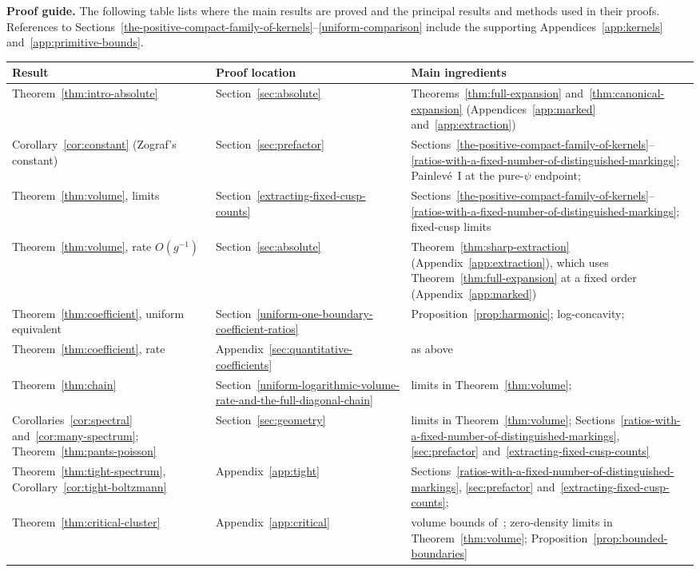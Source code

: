 \textbf{Proof guide.}
The following table lists where the main results are proved and the principal
results and methods used in their proofs. References to Sections~\ref{the-positive-compact-family-of-kernels}--\ref{uniform-comparison} include the supporting Appendices~\ref{app:kernels} and~\ref{app:primitive-bounds}.
\begin{center}
\small
\renewcommand{\arraystretch}{1.15}
\begin{tabular}{@{}p{}p{}p{}@{}}
\hline
Result & Proof location & Main ingredients\\
\hline
Theorem~\ref{thm:intro-absolute} & Section~\ref{sec:absolute} & Theorems~\ref{thm:full-expansion} and~\ref{thm:canonical-expansion} (Appendices~\ref{app:marked} and~\ref{app:extraction})\\
Corollary~\ref{cor:constant} (Zograf's constant) & Section~\ref{sec:prefactor} & Sections~\ref{the-positive-compact-family-of-kernels}--\ref{ratios-with-a-fixed-number-of-distinguished-markings}; Painlev\'e~I at the pure-$\psi$ endpoint; \cite{MZ}\\
Theorem~\ref{thm:volume}, limits & Section~\ref{extracting-fixed-cusp-counts} & Sections~\ref{the-positive-compact-family-of-kernels}--\ref{ratios-with-a-fixed-number-of-distinguished-markings}; fixed-cusp limits~\cite{Mir}\\
Theorem~\ref{thm:volume}, rate $O(g^{-1})$ & Section~\ref{sec:absolute} & Theorem~\ref{thm:sharp-extraction} (Appendix~\ref{app:extraction}), which uses Theorem~\ref{thm:full-expansion} at a fixed order (Appendix~\ref{app:marked})\\
Theorem~\ref{thm:coefficient}, uniform equivalent & Section~\ref{uniform-one-boundary-coefficient-ratios} & Proposition~\ref{prop:harmonic}; log-concavity; \cite{MZ}\\
Theorem~\ref{thm:coefficient}, rate & Appendix~\ref{sec:quantitative-coefficients} & as above\\
Theorem~\ref{thm:chain} & Section~\ref{uniform-logarithmic-volume-rate-and-the-full-diagonal-chain} & limits in Theorem~\ref{thm:volume}; \cite{ManZ}\\
Corollaries~\ref{cor:spectral} and~\ref{cor:many-spectrum}; Theorem~\ref{thm:pants-poisson} & Section~\ref{sec:geometry} & limits in Theorem~\ref{thm:volume}; Sections~\ref{ratios-with-a-fixed-number-of-distinguished-markings}, \ref{sec:prefactor} and~\ref{extracting-fixed-cusp-counts}\\
Theorem~\ref{thm:tight-spectrum}, Corollary~\ref{cor:tight-boltzmann} & Appendix~\ref{app:tight} & Sections~\ref{ratios-with-a-fixed-number-of-distinguished-markings}, \ref{sec:prefactor} and~\ref{extracting-fixed-cusp-counts}; \cite{BL,BZ}\\
Theorem~\ref{thm:critical-cluster} & Appendix~\ref{app:critical} & volume bounds of~\cite{MZ,SW}; zero-density limits in Theorem~\ref{thm:volume}; Proposition~\ref{prop:bounded-boundaries}\\
\hline
\end{tabular}
\end{center}
